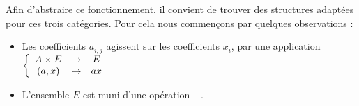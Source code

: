 \documentclass[11pt,a4paper]{article}
\begin{document}
	Afin d'abstraire ce fonctionnement, il convient de trouver des structures adaptées pour ces trois catégories. Pour cela nous commençons par quelques observations :
	
	\begin{itemize}
	
		\item Les coefficients $a_{i,j}$ agissent sur les coefficients $x_{i}$, par une application 
		$\left\lbrace \begin{array}{c c c}
		 A \times E & \to & E \\
		 (a,x) & \mapsto & ax
\end{array}
\right.$
		
		\item L'ensemble $E$ est muni d'une opération $+$.
	
	\end{itemize}
\end{document}

